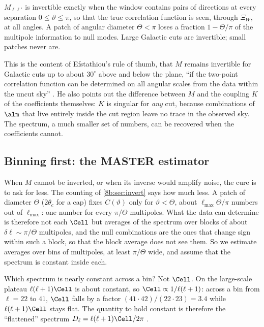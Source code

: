 \begin{keyidea}
$M_{\ell\ell'}$ is invertible exactly when the window contains pairs of directions at every separation
$0\le\vartheta\le\pi$, so that the true correlation function is seen, through $\Xi_W$, at all angles. A
patch of angular diameter $\Theta<\pi$ loses a fraction $1-\Theta/\pi$ of the multipole information
to null modes. Large Galactic cuts are invertible; small patches never are.
\end{keyidea}

This is the content of Efstathiou's rule of thumb, that $M$ remains invertible for Galactic cuts up
to about $30^\circ$ above and below the plane, ``if the two-point correlation function can be
determined on all angular scales from the data within the uncut sky'' \cite[§2.1]{Efstathiou2004}.
He also points out the difference between $M$ and the coupling $K$ of the coefficients themselves:
$K$ is singular for \emph{any} cut, because combinations of $\alm$ that live entirely inside the cut
region leave no trace in the observed sky. The spectrum, a much smaller set of numbers, can be
recovered when the coefficients cannot.

\subsection{Binning first: the MASTER estimator}
\label{8b:sec:binning}

When $M$ cannot be inverted, or when its inverse would amplify noise, the cure is to ask for less.
The counting of \cref{8b:sec:invert} says how much less. A patch of diameter $\Theta$ ($2\theta_c$ for a cap)
fixes $C(\vartheta)$ only for $\vartheta<\Theta$, about $\ell_{\max}\Theta/\pi$ numbers out of $\ell_{\max}$: one number for every
$\pi/\Theta$ multipoles. What the data can determine is therefore not each $\Cell$ but averages of the
spectrum over blocks of about $\delta\ell\sim\pi/\Theta$ multipoles, and the null combinations are the ones that
change sign within such a block, so that the block average does not see them. So we estimate averages
over bins of multipoles, at least $\pi/\Theta$ wide, and assume that the spectrum is constant inside each.

Which spectrum is nearly constant across a bin? Not $\Cell$. On the large-scale plateau $\ell(\ell+1)\Cell$ is
about constant, so $\Cell\propto1/\ell(\ell+1)$: across a bin from $\ell=22$ to $41$, $\Cell$ falls by a factor
$(41\cdot42)/(22\cdot23)=3.4$ while $\ell(\ell+1)\Cell$ stays flat. The quantity to hold constant is therefore the
``flattened'' spectrum $D_\ell=\ell(\ell+1)\Cell/2\pi$ .

